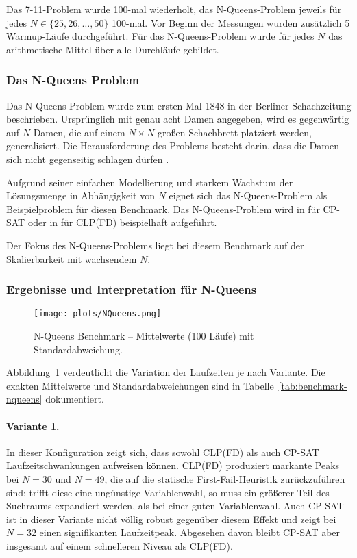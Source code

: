 \documentclass[12pt,a4paper]{article}
\begin{document}
Das 7-11-Problem wurde 100-mal wiederholt, das N-Queens-Problem jeweils für jedes $N \in \{25,26,\dots,50\}$ 100-mal.
Vor Beginn der Messungen wurden zusätzlich 5 Warmup-Läufe durchgeführt.
Für das N-Queens-Problem wurde für jedes $N$ das arithmetische Mittel über alle Durchläufe gebildet.
\subsubsection{Das N-Queens Problem}
Das N-Queens-Problem wurde zum ersten Mal 1848 in der Berliner Schachzeitung beschrieben.
Ursprünglich mit genau acht Damen angegeben, wird es gegenwärtig auf $N$ Damen, die auf einem $N \times N$ großen Schachbrett platziert werden, generalisiert.
Die Herausforderung des Problems besteht darin, dass die Damen sich nicht gegenseitig schlagen dürfen \cite{nqueens}.

Aufgrund seiner einfachen Modellierung und starkem Wachstum der Lösungsmenge in Abhängigkeit von $N$ eignet sich das N-Queens-Problem als Beispielproblem für diesen Benchmark.
Das N-Queens-Problem wird in \cite{ortools} für CP-SAT oder in \cite{drt} für CLP(FD) beispielhaft aufgeführt. 

Der Fokus des N-Queens-Problems liegt bei diesem Benchmark auf der Skalierbarkeit mit wachsendem $N$.
\subsubsection{Ergebnisse und Interpretation für N-Queens}

\begin{figure}[htbp]
  \centering
  \texttt{[image: plots/NQueens.png]}
  \caption{N-Queens Benchmark – Mittelwerte (100 Läufe) mit Standardabweichung.}
  \label{fig:nqueens}
\end{figure}

\noindent
Abbildung~\ref{fig:nqueens} verdeutlicht die Variation der Laufzeiten je nach Variante.
Die exakten Mittelwerte und Standardabweichungen sind in Tabelle~\ref{tab:benchmark-nqueens} dokumentiert.

\paragraph{Variante 1.}
In dieser Konfiguration zeigt sich, dass sowohl CLP(FD) als auch CP-SAT Laufzeitschwankungen aufweisen können. 
CLP(FD) produziert markante Peaks bei $N=30$ und $N=49$, die auf die statische First-Fail-Heuristik zurückzuführen sind: 
trifft diese eine ungünstige Variablenwahl, so muss ein größerer Teil des Suchraums expandiert werden, als bei einer \glqq guten\grqq{} Variablenwahl. 
Auch CP-SAT ist in dieser Variante nicht völlig robust gegenüber diesem Effekt und zeigt bei $N=32$ einen signifikanten Laufzeitpeak. 
Abgesehen davon bleibt CP-SAT aber insgesamt auf einem schnelleren Niveau als CLP(FD).
\end{document}
